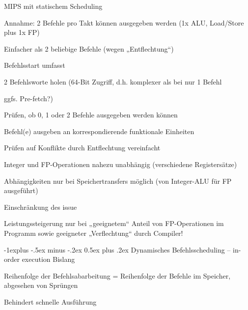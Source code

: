\documentclass[10pt,landscape]{article}
\makeatletter
\renewcommand{\subsection}{\@startsection{subsection}{2}{0mm}%
                                {-1explus -.5ex minus -.2ex}%
                                {0.5ex plus .2ex}%
                                {\normalfont\normalsize\bfseries}}
\makeatother
\begin{document}
\begin{multicols}{3}
  MIPS mit statischem Scheduling
  \begin{itemize*}
    \item Annahme: 2 Befehle pro Takt können ausgegeben werden (1x ALU, Load/Store plus 1x FP)
    \item Einfacher als 2 beliebige Befehle (wegen „Entflechtung“)
    \item Befehlsstart umfasst
    \item 2 Befehlsworte holen (64-Bit Zugriff, d.h. komplexer als bei nur 1 Befehl \item ggfs. Pre-fetch?)
    \item Prüfen, ob 0, 1 oder 2 Befehle ausgegeben werden können
    \item Befehl(e) ausgeben an korrespondierende funktionale Einheiten
    \item Prüfen auf Konflikte durch Entflechtung vereinfacht
    \item Integer und FP-Operationen nahezu unabhängig (verschiedene Registersätze)
    \item Abhängigkeiten nur bei Speichertransfers möglich (von Integer-ALU für FP ausgeführt) \item Einschränkung des issue 
    \item Leistungssteigerung nur bei „geeignetem“ Anteil von FP-Operationen im Programm sowie geeigneter „Verflechtung“ durch Compiler!
  \end{itemize*}
  
  \subsection{ Dynamisches Befehlsscheduling – in-order execution}
  Bislang
  \begin{itemize*}
    \item Reihenfolge der Befehlsabarbeitung = Reihenfolge der Befehle im Speicher, abgesehen von Sprüngen
    \item Behindert schnelle Ausführung
  \end{itemize*}
  

\end{multicols}
\end{document}
